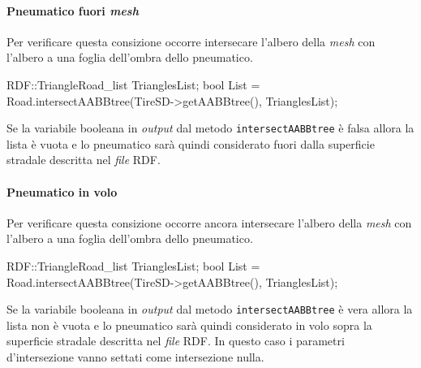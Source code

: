 \paragraph{Pneumatico fuori \textit{mesh}}
Per verificare questa consizione occorre intersecare l'albero della \textit{mesh} con l'albero a una foglia dell'ombra dello pneumatico.
\begin{pseudoc}
	RDF::TriangleRoad_list TrianglesList;
	bool List = Road.intersectAABBtree(TireSD->getAABBtree(), TrianglesList);
\end{pseudoc}
Se la variabile booleana in \textit{output} dal metodo \texttt{intersectAABBtree} è falsa allora la lista è vuota e lo pneumatico sarà quindi considerato fuori dalla superficie stradale descritta nel \textit{file} \ac{RDF}.
%
\paragraph{Pneumatico in volo}
Per verificare questa consizione occorre ancora intersecare l'albero della \textit{mesh} con l'albero a una foglia dell'ombra dello pneumatico.
\begin{pseudoc}
	RDF::TriangleRoad_list TrianglesList;
	bool List = Road.intersectAABBtree(TireSD->getAABBtree(), TrianglesList);
\end{pseudoc}
Se la variabile booleana in \textit{output} dal metodo \texttt{intersectAABBtree} è vera allora la lista non è vuota e lo pneumatico sarà quindi considerato in volo sopra la superficie stradale descritta nel \textit{file} \ac{RDF}. In questo caso i parametri d'intersezione vanno settati come intersezione nulla.
%
%

